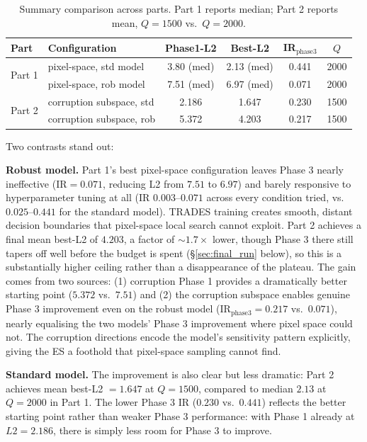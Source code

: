\documentclass[11pt, a4paper]{article}
\begin{document}
\begin{table}[htbp]
\centering
\caption{Summary comparison across parts. Part 1 reports median; Part 2 reports mean, $Q=1500$ vs.\ $Q=2000$.}
\label{tab:all_stages}
\begin{tabular}{llcccc}
\toprule
Part & Configuration & Phase1-L2 & Best-L2 & IR$_\text{phase3}$ & $Q$ \\
\midrule
\multirow{2}{*}{Part 1} & pixel-space, std model & 3.80 (med) & 2.13 (med) & 0.441 & 2000 \\
                          & pixel-space, rob model & 7.51 (med) & 6.97 (med) & 0.071 & 2000 \\
\midrule
\multirow{2}{*}{Part 2} & corruption subspace, std & 2.186 & 1.647 & 0.230 & 1500 \\
                          & corruption subspace, rob & 5.372 & 4.203 & 0.217 & 1500 \\
\bottomrule
\end{tabular}
\end{table}

Two contrasts stand out:

\textbf{Robust model.} Part 1's best pixel-space configuration leaves Phase 3 nearly ineffective ($\mathrm{IR}=0.071$, reducing L2 from $7.51$ to $6.97$) and barely responsive to hyperparameter tuning at all (IR $0.003$--$0.071$ across every condition tried, vs.\ $0.025$--$0.441$ for the standard model). TRADES training creates smooth, distant decision boundaries that pixel-space local search cannot exploit. Part 2 achieves a final mean best-L2 of $4.203$, a factor of $\sim1.7\times$ lower, though Phase 3 there still tapers off well before the budget is spent (\S\ref{sec:final_run} below), so this is a substantially higher ceiling rather than a disappearance of the plateau. The gain comes from two sources: (1) corruption Phase 1 provides a dramatically better starting point ($5.372$ vs.\ $7.51$) and (2) the corruption subspace enables genuine Phase 3 improvement even on the robust model (IR$_\text{phase3}=0.217$ vs.\ $0.071$), nearly equalising the two models' Phase 3 improvement where pixel space could not. The corruption directions encode the model's sensitivity pattern explicitly, giving the ES a foothold that pixel-space sampling cannot find.

\textbf{Standard model.} The improvement is also clear but less dramatic: Part 2 achieves mean best-L2 $=1.647$ at $Q=1500$, compared to median $2.13$ at $Q=2000$ in Part 1. The lower Phase 3 IR ($0.230$ vs.\ $0.441$) reflects the better starting point rather than weaker Phase 3 performance: with Phase 1 already at $L2=2.186$, there is simply less room for Phase 3 to improve.
\end{document}
